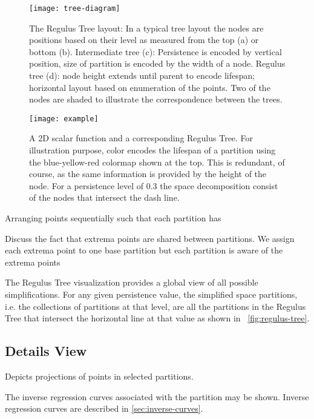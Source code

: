 \begin{figure}[htb]
    \begin{center}
     \texttt{[image: tree-diagram]}
    \caption{The Regulus Tree layout: In a typical tree layout the nodes are positions based on their level as measured from the top (a) or bottom (b). Intermediate tree (c): Persistence is encoded by vertical position, size of partition is encoded by the width of a node.  Regulus tree (d): node height extends until parent to encode lifespan; horizontal layout based on enumeration of the points. Two of the nodes are shaded to illustrate the correspondence between the trees.}
    \label{fig:tree-diagram}
    \end{center}
\end{figure}

\begin{figure}[htb]
    \begin{center}
    \texttt{[image: example]}
    \caption{A 2D scalar function and a corresponding Regulus Tree. For illustration purpose, color encodes the lifespan of a partition using the blue-yellow-red colormap shown at the top. This is redundant, of course, as the same information is provided by the height of the node. For a persistence level of 0.3 the space decomposition consist of the nodes that intersect the dash line.}
    \label{fig:regulus-tree}
    \end{center}
\end{figure}
Arranging points sequentially such that each partition has 

Discuss the fact that extrema points are shared between partitions. We assign each extrema point to one base partition but each partition is aware of the extrema points

The Regulus Tree visualization provides a global view of all possible simplifications. For any given persistence value, the simplified space partitions, i.e. the collections of partitions at that level, are all the partitions in the Regulus Tree that intersect the horizontal line at that value as shown in ~\autoref{fig:regulus-tree}.


\subsection{Details View}
\label{sec:details}

Depicts projections of points in selected partitions. 

The inverse regression curves associated with the partition may be shown. Inverse regression curves are described in \autoref{sec:inverse-curves}.

